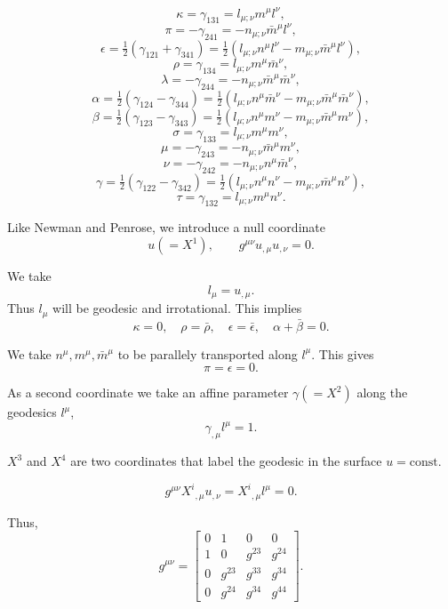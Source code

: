 \[
\kappa = \gamma_{131} = l_{\mu;\nu} m^{\mu} l^{\nu},
\]
\[
\pi = -\gamma_{241} = -n_{\mu;\nu} \bar{m}^{\mu} l^{\nu},
\]
\[
\epsilon = \tfrac{1}{2}(\gamma_{121} + \gamma_{341})
= \tfrac{1}{2}(l_{\mu;\nu} n^{\mu} l^{\nu} - m_{\mu;\nu} \bar{m}^{\mu} l^{\nu}),
\]
\[
\rho = \gamma_{134} = l_{\mu;\nu} m^{\mu} \bar{m}^{\nu},
\]
\[
\lambda = -\gamma_{244} = -n_{\mu;\nu} \bar{m}^{\mu} \bar{m}^{\nu},
\]
\[
\alpha = \tfrac{1}{2}(\gamma_{124} - \gamma_{344})
= \tfrac{1}{2}(l_{\mu;\nu} n^{\mu} \bar{m}^{\nu} - m_{\mu;\nu} \bar{m}^{\mu} \bar{m}^{\nu}),
\]
\[
\beta = \tfrac{1}{2}(\gamma_{123} - \gamma_{343})
= \tfrac{1}{2}(l_{\mu;\nu} n^{\mu} m^{\nu} - m_{\mu;\nu} \bar{m}^{\mu} m^{\nu}),
\]
\[
\sigma = \gamma_{133} = l_{\mu;\nu} m^{\mu} m^{\nu},
\]
\[
\mu = -\gamma_{243} = -n_{\mu;\nu} \bar{m}^{\mu} m^{\nu},
\]
\[
\nu = -\gamma_{242} = -n_{\mu;\nu} n^{\mu} \bar{m}^{\nu},
\]
\[
\gamma = \tfrac{1}{2}(\gamma_{122} - \gamma_{342})
= \tfrac{1}{2}(l_{\mu;\nu} n^{\mu} n^{\nu} - m_{\mu;\nu} \bar{m}^{\mu} n^{\nu}),
\]
\[
\tau = \gamma_{132} = l_{\mu;\nu} m^{\mu} n^{\nu}. \tag{2.4}
\]

Like Newman and Penrose, we introduce a null coordinate 
\[
u (= X^{1}), \qquad g^{\mu\nu} u_{,\mu} u_{,\nu} = 0. \tag{3.1}
\]

We take 
\[
l_{\mu} = u_{,\mu}.
\]
Thus $l_{\mu}$ will be geodesic and irrotational. This implies
\[
\kappa = 0, \quad \rho = \bar{\rho}, \quad 
\epsilon = \bar{\epsilon}, \quad \alpha + \bar{\beta} = 0. \tag{3.2}
\]

We take $n^{\mu}, m^{\mu}, \bar{m}^{\mu}$ to be parallely transported 
along $l^{\mu}$. This gives
\[
\pi = \epsilon = 0. \tag{3.3}
\]

As a second coordinate we take an affine parameter $\gamma(=X^{2})$ 
along the geodesics $l^{\mu}$,
\[
\gamma_{,\mu} l^{\mu} = 1. \tag{3.4}
\]

$X^{3}$ and $X^{4}$ are two coordinates that label the geodesic 
in the surface $u=\text{const}$.  

\[
g^{\mu\nu} X^{i}{}_{,\mu} u_{,\nu} = X^{i}{}_{,\mu} l^{\mu} = 0. \tag{3.5}
\]

Thus,
\[
g^{\mu\nu} =
\begin{bmatrix}
0 & 1 & 0 & 0 \\
1 & 0 & g^{23} & g^{24} \\
0 & g^{23} & g^{33} & g^{34} \\
0 & g^{24} & g^{34} & g^{44}
\end{bmatrix}. \tag{3.6}
\]

